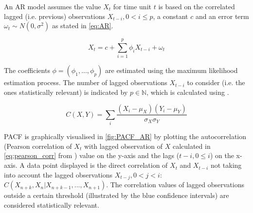 An \ac{AR} model assumes the value $X_t$ for time unit $t$ is based on the correlated lagged (i.e. previous) observations $X_{t-i}, 0 < i \le p$, a constant $c$ and an error term $\omega_t \sim  N(0, \sigma^2)$ as stated in \eqref{eq:AR}.
%
\begin{ceqn}
    \begin{equation}
    \label{eq:AR}
        X_t = c + \sum_{i=1}^p \phi_i X_{t-i} + \omega_t
    \end{equation}
\end{ceqn}
%
The coefficients $\phi = (\phi_1, ..., \phi_p)$ are estimated using the maximum likelihood estimation process.
The number of lagged observations $X_{t-i}$ to consider (i.e. the ones statistically relevant) is indicated by $p \in \mathbb{N}$, which is calculated using .
%
\begin{ceqn}
    \begin{equation}
    \label{eq:pearson_corr}
        C(X,Y)=\sum_{i}^{}\frac{(X_i-\mu_X)(Y_i-\mu_Y)}{\sigma_X \sigma_Y}
    \end{equation}
\end{ceqn}
%
\ac{PACF} is graphically visualised in \autoref{fig:PACF_AR} by plotting the autocorrelation (Pearson correlation of $X_t$ with lagged observation of $X$ calculated in \autoref{eq:pearson_corr} from \cite{p_acf}) value on the y-axis and the lags ($t - i, 0 \le i$) on the x-axis. A data point displayed is the direct correlation of $X_t$ and $X_ {t-i}$ not taking into account the lagged observations $X_ {t-j}, 0 < j < i$: $C(X_{n+k},X_n|X_{n+k-1}, ..., X_{n+1})$.
The correlation values of lagged observations outside a certain threshold (illustrated by the blue confidence intervals) are considered statistically relevant.
%
